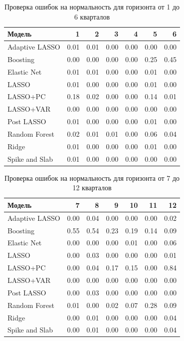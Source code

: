 \begin{table}[ht]
\centering
\caption{Проверка ошибок на нормальность для горизонта от 1 до 6 кварталов}
\label{tab:er1}
\begin{tabular}{lrrrrrr}
  \hline
Модель & 1 & 2 & 3 & 4 & 5 & 6 \\ 
  \hline
Adaptive LASSO & 0.01 & 0.01 & 0.00 & 0.00 & 0.00 & 0.00 \\ 
  Boosting & 0.00 & 0.00 & 0.00 & 0.00 & 0.25 & 0.45 \\ 
  Elastic Net & 0.01 & 0.01 & 0.00 & 0.00 & 0.01 & 0.00 \\ 
  LASSO & 0.01 & 0.00 & 0.00 & 0.00 & 0.01 & 0.00 \\ 
  LASSO+PC & 0.18 & 0.02 & 0.00 & 0.00 & 0.14 & 0.01 \\ 
  LASSO+VAR & 0.00 & 0.00 & 0.00 & 0.00 & 0.00 & 0.00 \\ 
  Post LASSO & 0.01 & 0.00 & 0.00 & 0.00 & 0.01 & 0.00 \\ 
  Random Forest & 0.02 & 0.01 & 0.01 & 0.00 & 0.06 & 0.04 \\ 
  Ridge & 0.01 & 0.00 & 0.00 & 0.00 & 0.01 & 0.00 \\ 
  Spike and Slab & 0.01 & 0.00 & 0.00 & 0.00 & 0.00 & 0.00 \\ 
   \hline
\end{tabular}
\end{table}


\begin{table}[ht]
\centering
\caption{Проверка ошибок на нормальность для горизонта от 7 до 12 кварталов}
\begin{tabular}{lrrrrrr}
  \hline
Модель & 7 & 8 & 9 & 10 & 11 & 12 \\ 
  \hline
Adaptive LASSO & 0.00 & 0.04 & 0.00 & 0.00 & 0.00 & 0.02 \\ 
  Boosting & 0.55 & 0.54 & 0.23 & 0.19 & 0.14 & 0.09 \\ 
  Elastic Net & 0.00 & 0.00 & 0.00 & 0.01 & 0.00 & 0.06 \\ 
  LASSO & 0.00 & 0.03 & 0.00 & 0.00 & 0.00 & 0.01 \\ 
  LASSO+PC & 0.00 & 0.04 & 0.17 & 0.15 & 0.00 & 0.84 \\ 
  LASSO+VAR & 0.00 & 0.00 & 0.00 & 0.00 & 0.00 & 0.00 \\ 
  Post LASSO & 0.00 & 0.03 & 0.00 & 0.00 & 0.00 & 0.00 \\ 
  Random Forest & 0.01 & 0.00 & 0.02 & 0.07 & 0.28 & 0.09 \\ 
  Ridge & 0.00 & 0.01 & 0.00 & 0.00 & 0.00 & 0.04 \\ 
  Spike and Slab & 0.00 & 0.01 & 0.00 & 0.00 & 0.00 & 0.04 \\ 
   \hline
\end{tabular}
\end{table}


